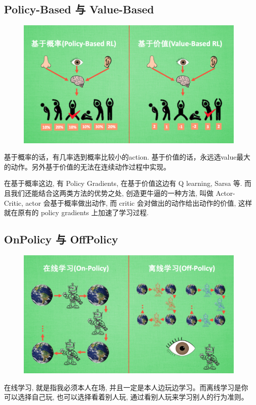 \documentclass[UTF8,a4paper,12pt]{ctexbook}
\begin{document}
	
		\subsection{Policy-Based 与  Value-Based}
			\begin{figure}[H]
				\centering
				\includegraphics[width=.8\linewidth]{PolicyWithValue}
			\end{figure}
			
			基于概率的话，有几率选到概率比较小的action. 基于价值的话，永远选value最大的动作。另外基于价值的无法在连续动作过程中实现。
		
			在基于概率这边, 有 Policy Gradients, 在基于价值这边有 Q learning, Sarsa 等. 而且我们还能结合这两类方法的优势之处, 创造更牛逼的一种方法, 叫做 Actor-Critic, actor 会基于概率做出动作, 而 critic 会对做出的动作给出动作的价值, 这样就在原有的 policy gradients 上加速了学习过程.
			
		\subsection{OnPolicy  与 OffPolicy}
			\begin{figure}[H]
				\centering
				\includegraphics[width=.8\linewidth]{OnOffPolicy}
			\end{figure}

			在线学习, 就是指我必须本人在场, 并且一定是本人边玩边学习。而离线学习是你可以选择自己玩, 也可以选择看着别人玩, 通过看别人玩来学习别人的行为准则。
			
\end{document}

